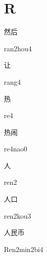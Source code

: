﻿%
\section*{R}
\begin{multicols*}{2}

\begin{verbete}{然后}
\begin{pronuncia}{ran2hou4}
\end{pronuncia}
\end{verbete}

\begin{verbete}[rang4]{让}
\begin{pronuncia}{rang4}
\end{pronuncia}
\end{verbete}

\begin{verbete}[re4]{热}
\begin{pronuncia}{re4}
\end{pronuncia}
\end{verbete}

\begin{verbete}[re4nao0]{热闹}
\begin{pronuncia}{re4nao0}
\end{pronuncia}
\end{verbete}

\begin{verbete}[ren2]{人}
\begin{pronuncia}{ren2}
\end{pronuncia}
\end{verbete}

\begin{verbete}{人口}
\begin{pronuncia}{ren2kou3}
\end{pronuncia}
\end{verbete}

\begin{verbete}{人民币}
\begin{pronuncia}{Ren2min2bi4}
\end{pronuncia}
\end{verbete}


\end{multicols*}
